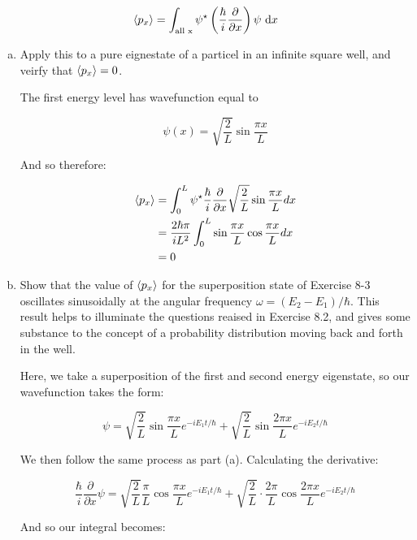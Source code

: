 \documentclass[10pt]{article}
\begin{document}
    \[ \langle p_x \rangle = \int_{\text{all x}} \psi^\star \left(\frac \hbar i \frac{\partial}{\partial x}\right) \psi \ \mathrm d x\] 

    \begin{enumerate}[(a)]
        \item Apply this to a pure eignestate of a particel in an infinite square well, and veirfy that $\langle p_x \rangle = 0$.
        
        \begin{solution}
            The first energy level has wavefunction equal to

            \[ \psi(x) = \sqrt{\frac{2}{L}} \sin \frac{\pi x}{L}\] 

            And so therefore: 

            \begin{align*}
                \langle p_x \rangle &= \int_0^L \psi^\star \frac \hbar i  \frac{\partial}{\partial x}\sqrt{\frac{2}{L}} \sin \frac{\pi x}{L} dx\\
                &= \frac{2\hbar \pi}{iL^2} \int_0^L \sin \frac{\pi x}{L} \cos \frac{\pi x}{L} dx \\
                &= 0
            \end{align*}
        \end{solution}

        \item Show that the value of $\langle p_x \rangle$ for the superposition state of Exercise 8-3 oscillates sinusoidally at the angular frequency $\omega = (E_2 - E_1)/\hbar$. This result helps to illuminate the questions reaised in Exercise 8.2, and gives some substance to the concept of a probability distribution moving back and forth in the well. 
        
        \begin{solution}
            Here, we take a superposition of the first and second energy eigenstate, so our wavefunction takes the form: 

            \[ \psi = \sqrt{\frac{2}{L}} \sin \frac{\pi x}{L} e^{-iE_1t/\hbar} + \sqrt{\frac{2}{L}} \sin \frac{2\pi x}{L} e^{-iE_2t/\hbar}\] 

            We then follow the same process as part (a). Calculating the derivative:

            \[ \frac \hbar i \frac{\partial}{\partial x} \psi = \sqrt{\frac{2}{L}} \frac \pi L \cos \frac{\pi x}{L} e^{-iE_1t/\hbar} + \sqrt{\frac{2}{L}} \cdot \frac{2\pi}{L} \cos \frac{2\pi x}{L} e^{-iE_2t/\hbar}\] 

            And so our integral becomes: 



\end{solution}
\end{enumerate}
\end{document}
